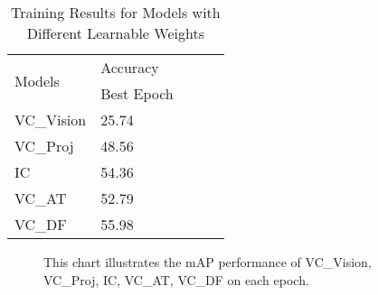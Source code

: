 \begin{table}[ht]
    \centering
    \caption{Training Results for Models with Different Learnable Weights}
    \label{tab:ablation_vc}
    \begin{tabular}{lllll}
        \toprule
        \multirow{2}{*}{Models} & Accuracy \\
        \cmidrule{2-2} 
        {} &  Best Epoch \\
        \midrule
        VC\_Vision & 25.74 \\
        VC\_Proj   & 48.56 \\
        IC         & 54.36 \\
        VC\_AT     & 52.79 \\
        VC\_DF     & 55.98 \\
        \bottomrule
    \end{tabular}
\end{table}

\begin{figure}[ht]
    \centering
    \resizebox{1.0\textwidth}{!}{}
    \caption[mAP performance on each epoch of VC\_Vision, VC\_Proj, IC, VC\_AT, VC\_DF on each epoch]{This chart illustrates the mAP performance of VC\_Vision, VC\_Proj, IC, VC\_AT, VC\_DF on each epoch.}
    \label{fig:ablation_vc}
\end{figure}



